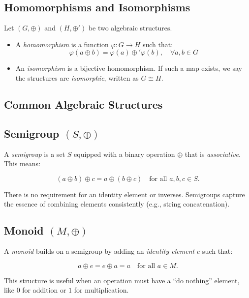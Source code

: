 \subsection{Homomorphisms and Isomorphisms}

Let \((G, \oplus)\) and \((H, \oplus')\) be two algebraic structures.

\begin{itemize}[label=\(-\)]
    \item A \emph{homomorphism} is a function \(\varphi: G \rightarrow H\) such that:
    \[
    \varphi(a \oplus b) = \varphi(a) \oplus' \varphi(b), \quad \forall a,b \in G
    \]
    
    \item An \emph{isomorphism} is a bijective homomorphism. If such a map exists, we say the structures are \emph{isomorphic}, written as \(G \cong H\).
\end{itemize}

\subsection{Common Algebraic Structures}

\subsection{Semigroup \texorpdfstring{\((S, \oplus)\)}{}}

A \emph{semigroup} is a set \(S\) equipped with a binary operation \(\oplus\) that is \emph{associative}. This means:

\[
(a \oplus b) \oplus c = a \oplus (b \oplus c) \quad \text{for all } a, b, c \in S.
\]

There is no requirement for an identity element or inverses. Semigroups 
capture the essence of combining elements consistently (e.g., string concatenation).

\subsection{Monoid \texorpdfstring{\((M, \oplus)\)}{}}

A \emph{monoid} builds on a semigroup by adding an \emph{identity element} \(e\) such that:

\[
a \oplus e = e \oplus a = a \quad \text{for all } a \in M.
\]

This structure is useful when an operation must have a “do nothing” element, like \(0\) for addition or \(1\) for multiplication.

